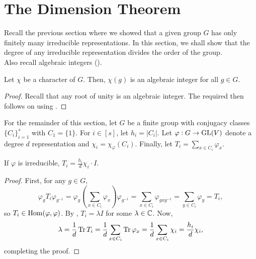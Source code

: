 \section{The Dimension Theorem}

	Recall the previous section where we showed that a given group $G$ has only finitely many irreducible representations. In this section, we shall show that the degree of any irreducible representation divides the order of the group.\\
	Also recall algebraic integers ().

	\begin{fprop}
		\label{prop: character alg int}
		Let $\chi$ be a character of $G$. Then, $\chi(g)$ is an algebraic integer for all $g \in G$.
	\end{fprop}
	\begin{proof}
		Recall that any root of unity is an algebraic integer. The required then follows on using .
	\end{proof}

	For the remainder of this section, let $G$ be a finite group with conjugacy classes $\{C_i\}_{i=1}^s$ with $C_1 = \{1\}$. For $i \in [s]$, let $h_i = |C_i|$. Let $\varphi : G \to \operatorname{GL}(V)$ denote a degree $d$ representation and $\chi_i = \chi_\varphi(C_i)$. Finally, let $T_i = \sum_{x \in C_i} \varphi_x$.

	\begin{flem}
		If $\varphi$ is irreducible, $T_i = \frac{h_i}{d} \chi_i \cdot I$.
	\end{flem}
	\begin{proof}
		First, for any $g \in G$,
		\[ \varphi_g T_i \varphi_{g^{-1}} = \varphi_g \left( \sum_{x \in C_i} \varphi_x \right) \varphi_{g^{-1}} = \sum_{x \in C_i} \varphi_{gxg^{-1}} = \sum_{y \in C_i} \varphi_y = T_i, \]
		so $T_i \in \operatorname{Hom}(\varphi,\varphi)$. By , $T_i = \lambda I$ for some $\lambda \in \mathbb{C}$. Now,
		\[ \lambda = \frac{1}{d} \operatorname{Tr} T_i = \frac{1}{d} \sum_{x \in C_i} \operatorname{Tr} \varphi_x = \frac{1}{d} \sum_{x \in C_i} \chi_i = \frac{h_i}{d} \chi_i, \]
		completing the proof.
	\end{proof}

